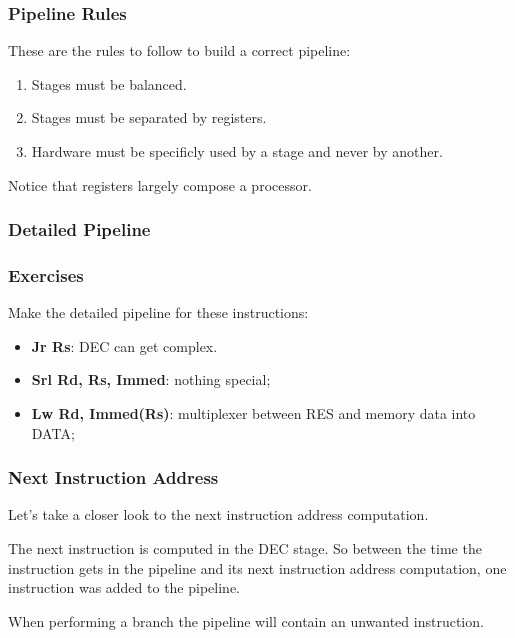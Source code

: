 
\begin{frame}
  \frametitle{Pipeline Rules}

  These are the rules to follow to build a correct pipeline:

  \begin{enumerate}
    \item
      Stages must be balanced.
    \item
      Stages must be separated by registers.
    \item
      Hardware must be specificly used by a stage and never by another.
  \end{enumerate}

  \-

  Notice that registers largely compose a processor.
\end{frame}


\begin{frame}
  \frametitle{Detailed Pipeline}

  \begin{center}
  \end{center}
\end{frame}


\begin{frame}
  \frametitle{Exercises}

  Make the detailed pipeline for these instructions:

  \begin{itemize}
    \item
      \textbf{Jr Rs}: DEC can get complex.
    \item
      \textbf{Srl Rd, Rs, Immed}: nothing special;
    \item
      \textbf{Lw Rd, Immed(Rs)}: \alert{multiplexer} between
      RES and memory data into DATA;
  \end{itemize}
\end{frame}


\begin{frame}
  \frametitle{Next Instruction Address}

  Let's take a closer look to the next instruction address computation.

  \-

  The next instruction is computed in the DEC stage. So between
  the time the instruction gets in the pipeline and its next instruction
  address computation, one instruction was added to the pipeline.

  \begin{center}
  \end{center}

  \-

  When performing a branch the pipeline will contain an unwanted
  instruction.
\end{frame}

